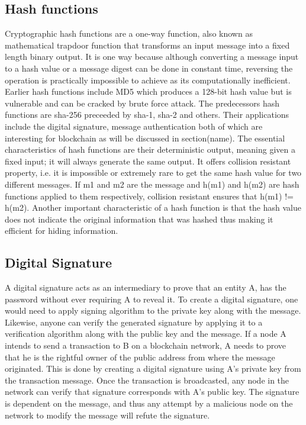 \subsection{Hash functions}
Cryptographic hash functions are a one-way function, also known as mathematical
trapdoor function that transforms an input message into a fixed length binary
output. It is one way because although converting a message input to a hash
value or a message digest can be done in constant time, reversing the operation
is practically impossible to achieve as its computationally inefficient.
Earlier hash functions include MD5 which produces a 128-bit hash value but is
vulnerable and can be cracked by brute force attack.  The predecessors hash
functions are sha-256 preceeded by sha-1, sha-2 and others. Their applications
include the digital signature, message authentication both of which are
interesting for blockchain as will be discussed in section(name). The essential
characteristics of hash functions are their deterministic output, meaning given
a fixed input; it will always generate the same output. It offers collision
resistant property, i.e. it is impossible or extremely rare to get the same
hash value for two different messages.  If m1 and m2 are the message and h(m1)
and h(m2) are hash functions applied to them respectively, collision resistant
ensures that h(m1) != h(m2). Another important characteristic of a hash
function is that the hash value does not indicate the original information that
was hashed thus making it efficient for hiding information.


\subsection{Digital Signature}
A digital signature acts as an intermediary to prove that an entity A, has the
password without ever requiring A to reveal it. To create a digital signature,
one would need to apply signing algorithm to the private key along with the
message. Likewise, anyone can verify the generated signature by applying it to
a verification algorithm along with the public key and the message.  If a node
A intends to send a transaction to B on a blockchain network, A needs to prove
that he is the rightful owner of the public address from where the message
originated.  This is done by creating a digital signature using A's private key
from the transaction message. Once the transaction is broadcasted, any node in
the network can verify that signature corresponds with A's public key. The
signature is dependent on the message, and thus any attempt by a malicious node
on the network to modify the message will refute the signature. 

